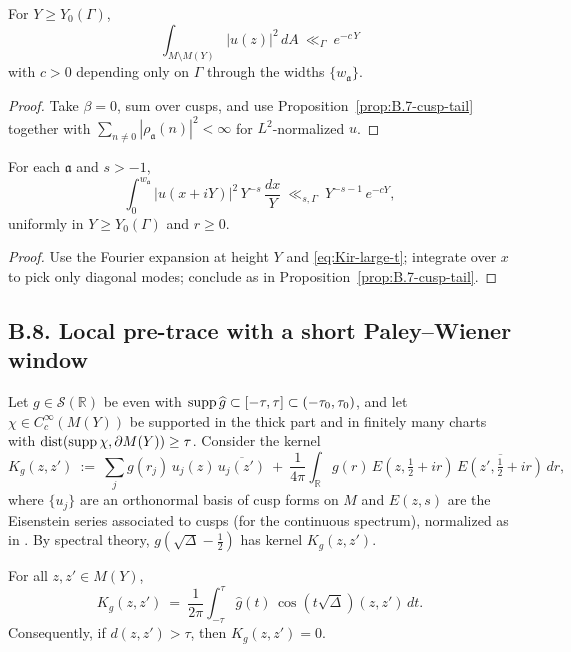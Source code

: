 \begin{corollary}\label{cor:B.7-L2Y}
For $Y\ge Y_0(\Gamma)$,
\[
\int_{M\setminus M(Y)} |u(z)|^2\,dA\ \ll_\Gamma\ e^{-c\,Y}
\]
with $c>0$ depending only on $\Gamma$ through the widths $\{w_{\mathfrak a}\}$.
\end{corollary}

\begin{proof}
Take $\beta=0$, sum over cusps, and use Proposition~\ref{prop:B.7-cusp-tail} together with $\sum_{n\neq 0} |\rho_{\mathfrak a}(n)|^2<\infty$ for $L^2$-normalized $u$.
\end{proof}

\begin{lemma}\label{lem:B.7-horo}
For each $\mathfrak a$ and $s>-1$,
\[
\int_{0}^{w_{\mathfrak a}} |u(x+iY)|^2\, Y^{-s}\, \frac{dx}{Y}
\ \ll_{s,\Gamma}\ Y^{-s-1}\, e^{-c Y},
\]
uniformly in $Y\ge Y_0(\Gamma)$ and $r\ge 0$.
\end{lemma}

\begin{proof}
Use the Fourier expansion at height $Y$ and \eqref{eq:Kir-large-t}; integrate over $x$ to pick only diagonal modes; conclude as in Proposition~\ref{prop:B.7-cusp-tail}.
\end{proof}

\subsection*{B.8. Local pre-trace with a short Paley--Wiener window}

\noindent
Let $g\in\mathcal S(\mathbb R)$ be even with $\operatorname{supp}\widehat g\subset[-\tau,\tau]\subset(-\tau_0,\tau_0)$,
and let $\chi\in C_c^\infty(M(Y))$ be supported in the thick part and in finitely many charts
with $\operatorname{dist}(\operatorname{supp}\chi,\partial M(Y))\ge \tau$. Consider the kernel
\[
K_g(z,z')\ :=\ \sum_j g(r_j)\, u_j(z)\,\overline{u_j(z')}
\ +\ \frac{1}{4\pi}\int_{\mathbb R} g(r)\,E(z,\tfrac12+ir)\,\overline{E(z',\tfrac12+ir)}\,dr,
\]
where $\{u_j\}$ are an orthonormal basis of cusp forms on $M$ and $E(z,s)$ are the Eisenstein series
associated to cusps (for the continuous spectrum), normalized as in \cite[Chap.~3]{Iwaniec2002}.
By spectral theory,
$g(\sqrt\Delta-\tfrac12)$ has kernel $K_g(z,z')$.

\begin{lemma}\label{lem:B.8-pretrace}
For all $z,z'\in M(Y)$,
\[
K_g(z,z')\ =\ \frac{1}{2\pi}\int_{-\tau}^{\tau} \widehat g(t)\, \cos(t\sqrt\Delta)(z,z')\,dt.
\]
Consequently, if $d(z,z')>\tau$, then $K_g(z,z')=0$.
\end{lemma}

